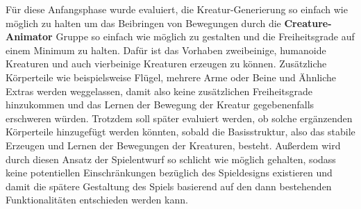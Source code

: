 Für diese Anfangsphase wurde evaluiert, die Kreatur-Generierung so einfach wie möglich zu halten um das Beibringen von Bewegungen durch die \textbf{Creature-Animator} Gruppe so einfach wie möglich zu gestalten und die Freiheitsgrade auf einem Minimum zu halten. Dafür ist das Vorhaben zweibeinige, humanoide Kreaturen und auch vierbeinige Kreaturen erzeugen zu können. Zusätzliche Körperteile wie beispielsweise Flügel, mehrere Arme oder Beine und Ähnliche Extras werden weggelassen, damit also keine zusätzlichen Freiheitsgrade hinzukommen und das Lernen der Bewegung der Kreatur gegebenenfalls erschweren würden. Trotzdem soll später evaluiert werden, ob solche ergänzenden Körperteile hinzugefügt werden könnten, sobald die Basisstruktur, also das stabile Erzeugen und Lernen der Bewegungen der Kreaturen, besteht. Außerdem wird durch diesen Ansatz der Spielentwurf so schlicht wie möglich gehalten, sodass keine potentiellen Einschränkungen bezüglich des Spieldesigns existieren und damit die spätere Gestaltung des Spiels basierend auf den dann bestehenden Funktionalitäten entschieden werden kann. 



